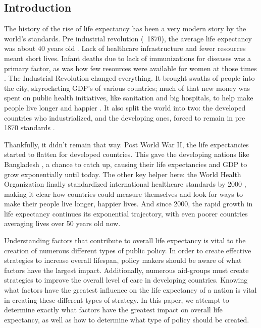 \documentclass[12pt]{article}
\begin{document}
\begin{multicols}{2}

\section{Introduction}
The history of the rise of life expectancy has been a very modern story by the world’s standards. Pre industrial revolution (~1870), the average life expectancy was about 40 years old \cite{roser2013life}. Lack of  healthcare infrastructure and fewer resources meant short lives. Infant deaths due to lack of immunizations for diseases was a primary factor, as was how few resources were available for women at those times \cite{griffin2008changing}. The Industrial Revolution changed everything. It brought swaths of people into the city, skyrocketing GDP’s of various countries; much of that new money was spent on public health initiatives, like sanitation and big hospitals, to help make people live longer and happier \cite{galvin2021focus}. It also split the world into two: the developed countries who industrialized, and the developing ones, forced to remain in pre 1870 standards \cite{wilkinson1992income}.

Thankfully, it didn’t remain that way. Post World War II, the life expectancies started to flatten for developed countries. This gave the developing nations like Bangladesh \cite{rahman2011time}, a chance to catch up, causing their life expectancies and GDP to grow exponentially until today. The other key helper here: the World Health Organization finally standardized international healthcare standards by 2000 \cite{mathers2001estimates}, making it clear how countries could measure themselves and look for ways to make their people live longer, happier lives. And since 2000, the rapid growth in life expectancy continues its exponential trajectory, with even poorer countries averaging lives over 50 years old now.

Understanding factors that contribute to overall life expectancy is vital to the creation of numerous different types of public policy. In order to create effective strategies to increase overall lifespan, policy makers should be aware of what factors have the largest impact. Additionally, numerous aid-groups must create strategies to improve the overall level of care in developing countries. Knowing what factors have the greatest influence on the life expectancy of a nation is vital in creating these different types of strategy. In this paper, we attempt to determine exactly what factors have the greatest impact on overall life expectancy, as well as how to determine what type of policy should be created.



\end{multicols}
\end{document}
